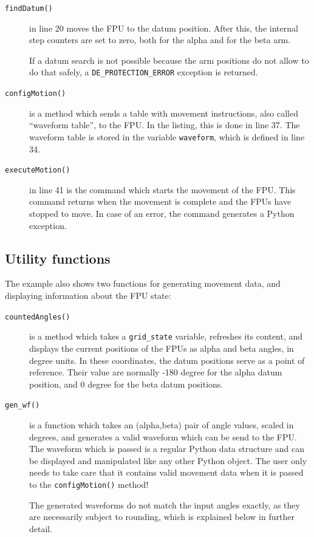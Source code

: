 \documentclass[11pt,a4paper]{scrartcl}
\begin{document}
\begin{description}
\item[\texttt{findDatum()}] in line 20 moves the FPU to the datum
  position. After this, the internal step counters are set to zero,
  both for the alpha and for the beta arm.

  If a datum search is not possible because the arm positions do not
  allow to do that safely, a \texttt{DE\_PROTECTION\_ERROR} exception
  is returned.

\item[\texttt{configMotion()}] is a method which sends a table with
  movement instructions, also called ``waveform table'', to the
  FPU. In the listing, this is done in line 37. The waveform table is
  stored in the variable \texttt{waveform}, which is defined in line
  34.

\item[\texttt{executeMotion()}] in line 41 is the command which starts
  the movement of the FPU. This command returns when the movement is
  complete and the FPUs have stopped to move. In case of an error, the
  command generates a Python exception.

\end{description}

\subsection{Utility functions}
The example also shows two  functions for generating movement
data, and displaying information about the FPU state:

\begin{description}
\item[\texttt{countedAngles()}] is a method which takes a
  \texttt{grid\_state} variable, refreshes its content, and displays
  the current positions of the FPUs as alpha and beta angles, in
  degree units. In these coordinates, the datum positions serve as a
  point of reference. Their value are normally -180 degree for the
  alpha datum position, and 0 degree for the beta datum positions.
  
\item[\texttt{gen\_wf()}] is a function which takes an (alpha,beta)
  pair of angle values, scaled in degrees, and generates a valid
  waveform which can be send to the FPU.  The waveform which is passed
  is a regular Python data structure and can be displayed and
  manipulated like any other Python object.  The user only needs to
  take care that it contains valid movement data when it is passed to
  the \texttt{configMotion()} method!

  The generated waveforms do not match the input angles exactly, as
  they are necessarily subject to rounding, which is explained below
  in further detail.

\end{description}
\end{document}

